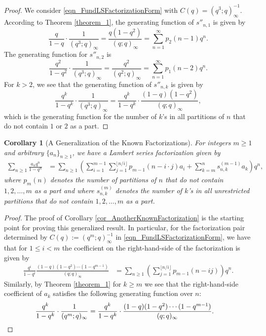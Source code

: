 \documentclass[10pt,reqno]{amsart}
\numberwithin{figure}{section}
\numberwithin{table}{section}
\theoremstyle{plain}
\newtheorem{cor}[theorem]{Corollary}
\numberwithin{theorem}{section}
\theoremstyle{remark}
\begin{document}
\begin{proof} 
	We consider \eqref{eqn_FundLSFactorizationForm} with $C(q)=(q^3;q)_{\infty}^{-1}$. According to Theorem \ref{theorem_1}, the generating function of $s''_{n,1}$ is given by
	$$\frac{q}{1-q}\cdot \frac{1}{(q^3;q)_\infty} = \frac{q(1-q^2)}{(q;q)_\infty} = \sum_{n=1}^{\infty} p_2(n-1) q^n.$$
	The generating function for  $s''_{n,2}$ is
	$$\frac{q^2}{1-q^2}\cdot \frac{1}{(q^3;q)_\infty} = \frac{q^2}{(q^2;q)_\infty} = \sum_{n=1}^{\infty} p_1(n-2) q^n.$$
	For $k>2$, we see that the generating function of $s''_{n,k}$ is given by
	$$\frac{q^k}{1-q^k} \cdot \frac{1}{(q^3;q)_\infty} = \frac{q^k}{1-q^k} \cdot \frac{(1-q)(1-q^2)}{(q;q)_\infty},$$
	which is the generating function for the number of $k$'s in all partitions of $n$ that do not contain $1$ or $2$ as a part.
\end{proof} 

\begin{cor}[A Generalization of the Known Factorizations] 
For integers $m \geq 1$ and arbitrary $\{a_n\}_{n \geq 1}$, we have a Lambert series 
factorization given by 
\begin{align*} 
\sum_{n \geq 1} \frac{a_n q^n}{1-q^n} & = \sum_{n \geq 1} \left( 
     \sum_{i=1}^{m-1} \sum_{j=1}^{\lfloor n / i \rfloor} p_{m-1}(n-i \cdot j) a_i + 
     \sum_{k=m}^n s_{n,k}^{(m-1)} a_k\right) q^n, 
\end{align*} 
where $p_m(n)$ denotes the number of partitions of $n$ that do not contain 
$1, 2, \ldots, m$ as a part and where $s_{n,k}^{(m)}$ denotes the number of $k$'s in all 
unrestricted partitions that do not contain $1, 2, \ldots, m$ as a part. 
\end{cor} 
\begin{proof} 
The proof of Corollary \ref{cor_AnotherKnownFactorization} is the starting point for proving this 
generalized result. In particular, for the factorization pair determined by 
$C(q) := (q^m; q)_{\infty}^{-1}$ in \eqref{eqn_FundLSFactorizationForm}, 
we have that for $1 \leq i < m$ the coefficient on the right-hand-side of the factorization is 
given by 
\begin{align*} 
\frac{q^i}{1-q^i} \frac{(1-q)(1-q^2) \cdots (1-q^{m-1})}{(q; q)_{\infty}} & = 
     \sum_{n \geq 1} \left(\sum_{j=1}^{\lfloor n/i \rfloor} p_{m-1}(n-ij)\right) q^n. 
\end{align*} 
Similarly, by Theorem \ref{theorem_1} for $k \geq m$ 
we see that the right-hand-side coefficient of 
$a_k$ satisfies the following generating function over $n$: 
\begin{align*} 
\frac{q^k}{1-q^k} \cdot \frac{1}{(q^m; q)_{\infty}} & = \frac{q^k}{1-q^k} \cdot 
     \frac{(1-q)(1-q^2) \cdots (1-q^{m-1})}{(q; q)_{\infty}}. 
     \qedhere
\end{align*} 
\end{proof} 
\end{document}
